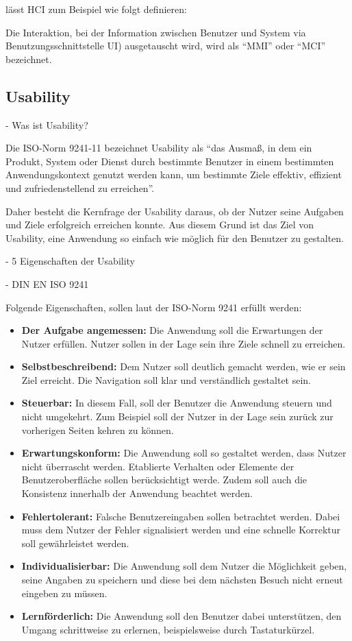 \noindent \citet{heimgartner_interkulturelles_2017} lässt \ac{HCI} zum Beispiel wie folgt definieren:

\begin{definition}
  Die Interaktion, bei der Information zwischen Benutzer und System via Benutzungsschnittstelle \ac{UI}) ausgetauscht wird, wird als \enquote{\ac{MMI}}  oder  \enquote{\ac{MCI}} 		 bezeichnet.
\end{definition}

\subsection{Usability}

- Was ist Usability?

Die ISO-Norm 9241-11 bezeichnet Usability als \enquote{das Ausmaß, in dem ein Produkt, System oder Dienst durch bestimmte Benutzer in einem bestimmten Anwendungskontext genutzt werden kann, um bestimmte Ziele effektiv, effizient und zufriedenstellend zu erreichen}.

Daher besteht die Kernfrage der Usability daraus, ob der Nutzer seine Aufgaben und Ziele erfolgreich erreichen konnte.
Aus diesem Grund ist das Ziel von Usability, eine Anwendung so einfach wie möglich für den Benutzer zu gestalten. \citep[vgl.]{jacobsen_praxisbuch_2019}

- 5 Eigenschaften der Usability

- DIN EN ISO 9241

Folgende Eigenschaften, sollen laut der ISO-Norm 9241 erfüllt werden:

\begin{itemize}
	\item \textbf{Der Aufgabe angemessen:} Die Anwendung soll die Erwartungen der Nutzer erfüllen. Nutzer sollen in der Lage sein ihre Ziele schnell zu erreichen.
	\item \textbf{Selbstbeschreibend:} Dem Nutzer soll deutlich gemacht werden, wie er sein Ziel erreicht. Die Navigation soll klar und verständlich gestaltet sein.
	\item \textbf{Steuerbar:} In diesem Fall, soll der Benutzer die Anwendung steuern und nicht umgekehrt. Zum Beispiel soll der Nutzer in der Lage sein zurück zur vorherigen Seiten kehren zu können.
	\item \textbf{Erwartungskonform:} Die Anwendung soll so gestaltet werden, dass Nutzer nicht überrascht werden. Etablierte Verhalten oder Elemente der Benutzeroberfläche sollen berücksichtigt werde. Zudem soll auch die Konsistenz innerhalb der Anwendung beachtet werden.
	\item \textbf{Fehlertolerant:} Falsche Benutzereingaben sollen betrachtet werden. Dabei muss dem Nutzer der Fehler signalisiert werden und eine schnelle Korrektur soll gewährleistet werden.
	\item \textbf{Individualisierbar:} Die Anwendung soll dem Nutzer die Möglichkeit geben, seine Angaben zu speichern und diese bei dem nächsten Besuch nicht erneut eingeben zu müssen.
	\item \textbf{Lernförderlich:} Die Anwendung soll den Benutzer dabei unterstützen, den Umgang schrittweise zu erlernen, beispielsweise durch Tastaturkürzel.
\end{itemize}

